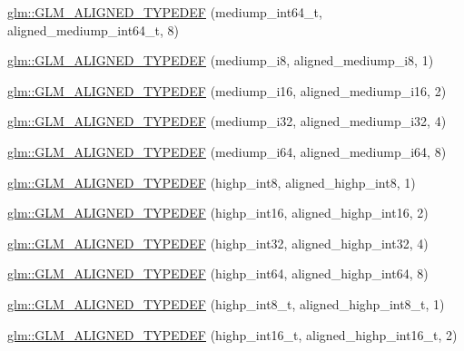 \begin{DoxyCompactItemize}
\item 
\hyperlink{group__gtx__type__aligned_ga73fdc86a539808af58808b7c60a1c4d8}{glm\-::\-G\-L\-M\-\_\-\-A\-L\-I\-G\-N\-E\-D\-\_\-\-T\-Y\-P\-E\-D\-E\-F} (mediump\-\_\-int64\-\_\-t, aligned\-\_\-mediump\-\_\-int64\-\_\-t, 8)
\item 
\hyperlink{group__gtx__type__aligned_gafafeea923e1983262c972e2b83922d3b}{glm\-::\-G\-L\-M\-\_\-\-A\-L\-I\-G\-N\-E\-D\-\_\-\-T\-Y\-P\-E\-D\-E\-F} (mediump\-\_\-i8, aligned\-\_\-mediump\-\_\-i8, 1)
\item 
\hyperlink{group__gtx__type__aligned_ga4b35ca5fe8f55c9d2fe54fdb8d8896f4}{glm\-::\-G\-L\-M\-\_\-\-A\-L\-I\-G\-N\-E\-D\-\_\-\-T\-Y\-P\-E\-D\-E\-F} (mediump\-\_\-i16, aligned\-\_\-mediump\-\_\-i16, 2)
\item 
\hyperlink{group__gtx__type__aligned_ga63b882e29170d428463d99c3d630acc6}{glm\-::\-G\-L\-M\-\_\-\-A\-L\-I\-G\-N\-E\-D\-\_\-\-T\-Y\-P\-E\-D\-E\-F} (mediump\-\_\-i32, aligned\-\_\-mediump\-\_\-i32, 4)
\item 
\hyperlink{group__gtx__type__aligned_ga8b20507bb048c1edea2d441cc953e6f0}{glm\-::\-G\-L\-M\-\_\-\-A\-L\-I\-G\-N\-E\-D\-\_\-\-T\-Y\-P\-E\-D\-E\-F} (mediump\-\_\-i64, aligned\-\_\-mediump\-\_\-i64, 8)
\item 
\hyperlink{group__gtx__type__aligned_ga56c5ca60813027b603c7b61425a0479d}{glm\-::\-G\-L\-M\-\_\-\-A\-L\-I\-G\-N\-E\-D\-\_\-\-T\-Y\-P\-E\-D\-E\-F} (highp\-\_\-int8, aligned\-\_\-highp\-\_\-int8, 1)
\item 
\hyperlink{group__gtx__type__aligned_ga7a751b3aff24c0259f4a7357c2969089}{glm\-::\-G\-L\-M\-\_\-\-A\-L\-I\-G\-N\-E\-D\-\_\-\-T\-Y\-P\-E\-D\-E\-F} (highp\-\_\-int16, aligned\-\_\-highp\-\_\-int16, 2)
\item 
\hyperlink{group__gtx__type__aligned_ga70cd2144351c556469ee6119e59971fc}{glm\-::\-G\-L\-M\-\_\-\-A\-L\-I\-G\-N\-E\-D\-\_\-\-T\-Y\-P\-E\-D\-E\-F} (highp\-\_\-int32, aligned\-\_\-highp\-\_\-int32, 4)
\item 
\hyperlink{group__gtx__type__aligned_ga46bbf08dc004d8c433041e0b5018a5d3}{glm\-::\-G\-L\-M\-\_\-\-A\-L\-I\-G\-N\-E\-D\-\_\-\-T\-Y\-P\-E\-D\-E\-F} (highp\-\_\-int64, aligned\-\_\-highp\-\_\-int64, 8)
\item 
\hyperlink{group__gtx__type__aligned_gab3e10c77a20d1abad2de1c561c7a5c18}{glm\-::\-G\-L\-M\-\_\-\-A\-L\-I\-G\-N\-E\-D\-\_\-\-T\-Y\-P\-E\-D\-E\-F} (highp\-\_\-int8\-\_\-t, aligned\-\_\-highp\-\_\-int8\-\_\-t, 1)
\item 
\hyperlink{group__gtx__type__aligned_ga968f30319ebeaca9ebcd3a25a8e139fb}{glm\-::\-G\-L\-M\-\_\-\-A\-L\-I\-G\-N\-E\-D\-\_\-\-T\-Y\-P\-E\-D\-E\-F} (highp\-\_\-int16\-\_\-t, aligned\-\_\-highp\-\_\-int16\-\_\-t, 2)

\end{DoxyCompactItemize}
